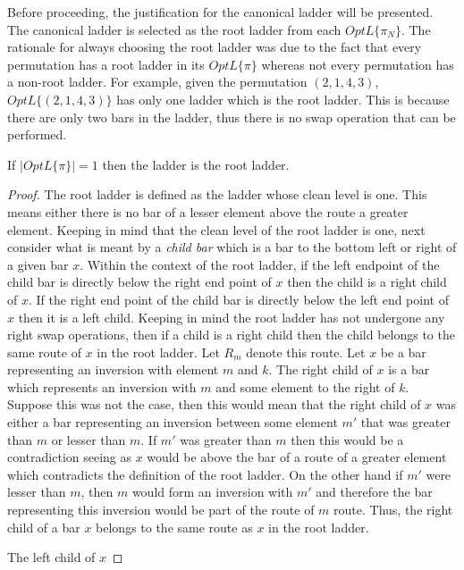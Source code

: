 Before proceeding, the justification for the canonical ladder will be presented. 
The canonical ladder is selected as the root ladder from each $OptL\{\pi_{N}\}$. 
The rationale for always choosing the root ladder was due to the fact that every 
permutation has a root ladder in its $OptL\{\pi\}$ whereas not every permutation 
has a non-root ladder. For example, given the permutation $(2,1,4,3)$, $OptL\{(2,1,4,3)\}$
has only one ladder which is the root ladder. This is because there are only two 
bars in the ladder, thus there is no swap operation that can be performed.
\begin{theorem}
    If $|OptL\{\pi\}|=1$ then the ladder is the root ladder.
\end{theorem} 
\begin{proof}
    The root ladder is defined as the ladder whose clean level is one.
    This means either there is no bar of a lesser element above the route a 
    greater element. Keeping in mind that the clean level of the root ladder is one, next consider what is meant by a  \emph{child bar}
     which is a bar to the bottom left or right of a given bar $x$. Within the context of the root ladder, 
     if the left endpoint of the child bar is directly below the right end point of $x$ then the child is a 
    right child of $x$. If the right end point of the child bar is directly 
    below the left end point of $x$ then it is a left child. 
    Keeping in mind the root ladder has not undergone any right swap operations, then
    if a child is a right child 
    then the child belongs to the same route of $x$ in the root ladder. 
    Let $R_{m}$ denote this route. Let $x$ be a bar representing an inversion with element $m$ and $k$.
    The right child of $x$ is a bar which represents an inversion 
    with $m$ and some element to the right of $k$. Suppose this was not the case, 
    then this would mean that the right child of $x$ was either a bar representing an inversion 
    between some element $m'$ that was greater than $m$ or lesser than $m$. If $m'$ was 
    greater than $m$ then this would be a contradiction seeing as $x$ would be above the bar of a route 
    of a greater element which contradicts the definition of the root ladder. On the other hand if 
    $m'$ were lesser than $m$, then $m$ would form an inversion with $m'$ and therefore 
    the bar representing this inversion would be part of the route of $m$ route. Thus, the right child 
    of a bar $x$ belongs to the same route as $x$ in the root ladder.\par The left child of $x$

\end{proof}
